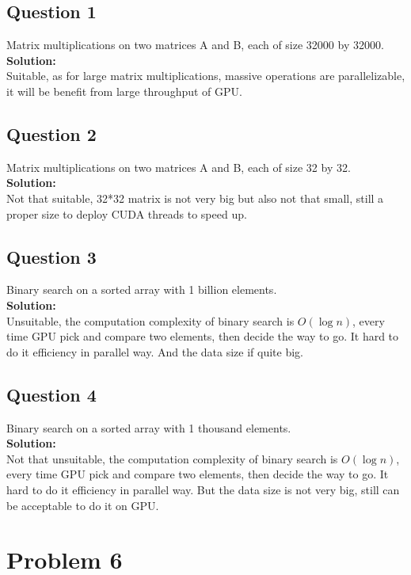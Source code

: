 \documentclass{article}
\begin{document}
\subsection{Question 1}
Matrix multiplications on two matrices A and B, each of size 32000 by 32000.
\\\textbf{Solution: }\\
Suitable, as for large matrix multiplications, massive operations are parallelizable, it will be benefit from large throughput of GPU.
\subsection{Question 2}
Matrix multiplications on two matrices A and B, each of size 32 by 32.
\\\textbf{Solution: }\\
Not that suitable, 32*32 matrix is not very big but also not that small, still a proper size to deploy CUDA threads to speed up.
\subsection{Question 3}
Binary search on a sorted array with 1 billion elements.
\\\textbf{Solution: }\\
Unsuitable, the computation complexity of binary search is $O(\log n)$, every time GPU pick and compare two elements, then decide the way to go. It hard to do it efficiency in parallel way. And the data size if quite big.
\subsection{Question 4}
Binary search on a sorted array with 1 thousand elements. 
\\\textbf{Solution: }\\
Not that unsuitable, the computation complexity of binary search is $O(\log n)$, every time GPU pick and compare two elements, then decide the way to go. It hard to do it efficiency in parallel way. But the data size is not very big, still can be acceptable to do it on GPU.

\pagebreak

\section{Problem 6}
\end{document}
